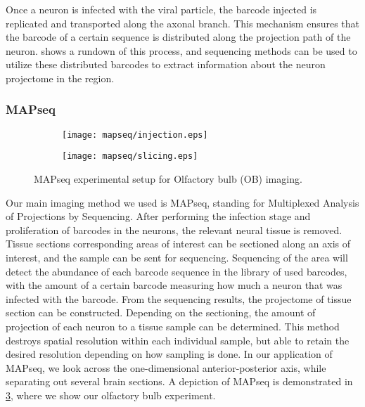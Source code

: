 \documentclass[../dissertation.tex]{subfiles}
\begin{document}
Once a neuron is infected with the viral particle, the barcode injected is replicated and transported along the axonal branch.
This mechanism ensures that the barcode of a certain sequence is distributed along the projection path of the neuron.
 shows a rundown of this process, and sequencing methods can be used to utilize these distributed barcodes to extract information about the neuron projectome in the region.

\subsubsection{MAPseq}

\begin{figure}[ht]
    \centering
    \begin{subfigure}[b]{0.4\textwidth}
        \texttt{[image: mapseq/injection.eps]}
        \label{fig:obmapseq-cartoon}
    \end{subfigure}
    \hfill
    \begin{subfigure}[b]{0.4\textwidth}
        \texttt{[image: mapseq/slicing.eps]}
        \label{fig:obmapseq-real}
    \end{subfigure}
    \caption{MAPseq experimental setup for Olfactory bulb (OB) imaging.}
    \label{fig:obmapseq}
\end{figure}

Our main imaging method we used is MAPseq, standing for Multiplexed Analysis of Projections by Sequencing.
After performing the infection stage and proliferation of barcodes in the neurons, the relevant neural tissue is removed.
Tissue sections corresponding areas of interest can be sectioned along an axis of interest, and the sample can be sent for sequencing.
Sequencing of the area will detect the abundance of each barcode sequence in the library of used barcodes, with the amount of a certain barcode measuring how much a neuron that was infected with the barcode.
From the sequencing results, the projectome of tissue section can be constructed.
Depending on the sectioning, the amount of projection of each neuron to a tissue sample can be determined.
This method destroys spatial resolution within each individual sample, but able to retain the desired resolution depending on how sampling is done.
In our application of MAPseq, we look across the one-dimensional anterior-posterior axis, while separating out several brain sections.
A depiction of MAPseq is demonstrated in \cref{fig:obmapseq}, where we show our olfactory bulb experiment.
\end{document}
